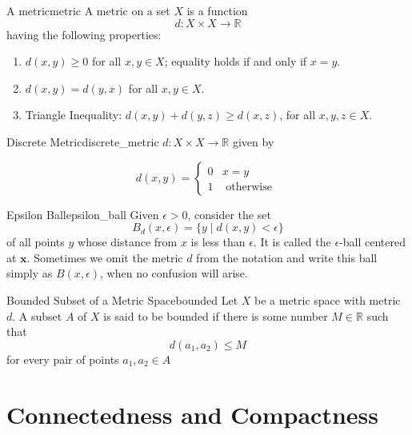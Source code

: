 \begin{definition}{A metric}{metric}
A metric on a set $X$ is a function
\[
    d: X \times X \to \mathbb{R} 
\]
having the following properties:
\begin{enumerate}
       \item $d(x, y) \geq 0$ for all $x, y \in X$; equality holds if and only if $x=y$.
       \item $d(x, y)=d(y, x)$ for all $x, y \in X$.
       \item Triangle Inequality: $d(x, y)+d(y, z) \geq d(x, z)$, for all $x, y, z \in X$.
\end{enumerate}
\end{definition}

\begin{example}{Discrete Metric}{discrete_metric}
 $d: X \times X \rightarrow \mathbb{R}$ given by

\[
d(x, y)= \begin{cases}0 & x=y \\ 1 & \text { otherwise }\end{cases}
\]
\end{example}


\begin{definition}{Epsilon Ball}{epsilon_ball}
Given $\epsilon>0$, consider the set
\[
B_{d}(x, \epsilon)=\{y \mid d(x, y)<\epsilon\}
\]
of all points $y$ whose distance from $x$ is less than $\epsilon$. It is called the $\epsilon$-ball centered at $\boldsymbol{x}$. Sometimes we omit the metric $d$ from the notation and write this ball simply as $B(x, \epsilon)$, when no confusion will arise.
\end{definition}








\begin{definition}{Bounded Subset of a Metric Space}{bounded}
Let $X$ be a metric space with metric $d$. A subset $A$ of $X$ is said to be bounded if there is some number $M \in  \mathbb{R}$ such that
\[
d\left(a_{1}, a_{2}\right) \leq M
\]
for every pair of points $ a_{ 1 } , a_{ 2 } \in  A $ 
\end{definition}






\section{Connectedness and Compactness}


